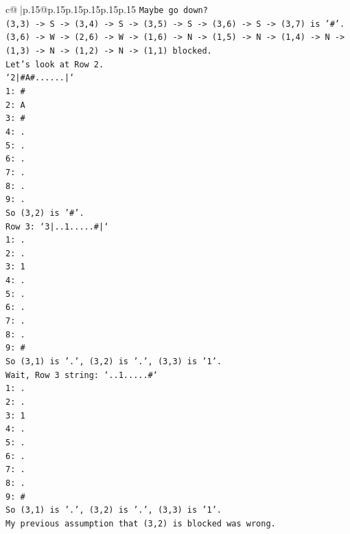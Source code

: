 \documentclass{article}
\begin{document}
{\begin{supertabular}{c@{$\;$}|p{.15\linewidth}@{}p{.15\linewidth}p{.15\linewidth}p{.15\linewidth}p{.15\linewidth}p{.15\linewidth}}
{{{\texttt{Maybe go down?} \\
\texttt{(3,3) {-}> S {-}> (3,4) {-}> S {-}> (3,5) {-}> S {-}> (3,6) {-}> S {-}> (3,7) is '\#'.} \\
\texttt{(3,6) {-}> W {-}> (2,6) {-}> W {-}> (1,6) {-}> N {-}> (1,5) {-}> N {-}> (1,4) {-}> N {-}> (1,3) {-}> N {-}> (1,2) {-}> N {-}> (1,1) blocked.} \\
\texttt{Let's look at Row 2.} \\
\texttt{`2|\#A\#......|`} \\
\texttt{1: \#} \\
\texttt{2: A} \\
\texttt{3: \#} \\
\texttt{4: .} \\
\texttt{5: .} \\
\texttt{6: .} \\
\texttt{7: .} \\
\texttt{8: .} \\
\texttt{9: .} \\
\texttt{So (3,2) is '\#'.} \\
\texttt{Row 3: `3|..1.....\#|`} \\
\texttt{1: .} \\
\texttt{2: .} \\
\texttt{3: 1} \\
\texttt{4: .} \\
\texttt{5: .} \\
\texttt{6: .} \\
\texttt{7: .} \\
\texttt{8: .} \\
\texttt{9: \#} \\
\texttt{So (3,1) is '.', (3,2) is '.', (3,3) is '1'.} \\
\texttt{Wait, Row 3 string: `..1.....\#`} \\
\texttt{1: .} \\
\texttt{2: .} \\
\texttt{3: 1} \\
\texttt{4: .} \\
\texttt{5: .} \\
\texttt{6: .} \\
\texttt{7: .} \\
\texttt{8: .} \\
\texttt{9: \#} \\
\texttt{So (3,1) is '.', (3,2) is '.', (3,3) is '1'.} \\
\texttt{My previous assumption that (3,2) is blocked was wrong.} \\
}}}
\end{supertabular}}
\end{document}
